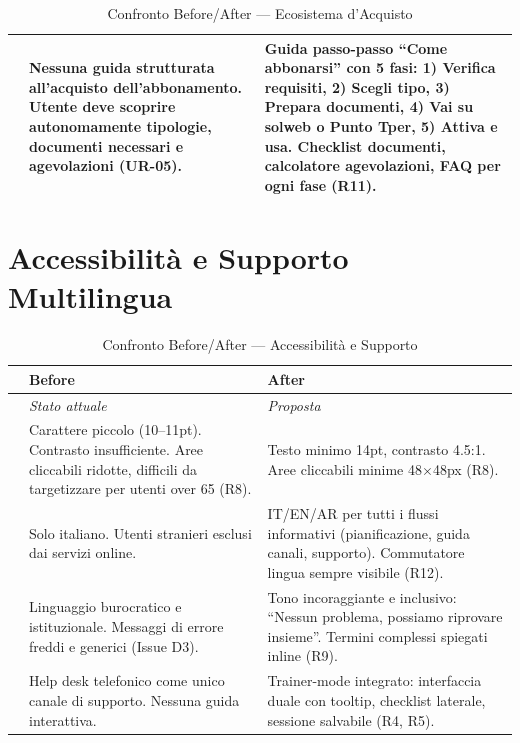 \documentclass[11pt,a4paper]{article}
\begin{document}
\begin{table}[H]
\begin{tabular}{|p{0.5cm}|p{7cm}|p{7cm}|}
\raisebox{0.5cm}{\rotatebox{90}{\textbf{Guida abbonamenti}}} &
Nessuna guida strutturata all'acquisto dell'abbonamento. Utente deve scoprire autonomamente tipologie, documenti necessari e agevolazioni (UR-05). &
Guida passo-passo ``Come abbonarsi'' con 5 fasi: 1) Verifica requisiti, 2) Scegli tipo, 3) Prepara documenti, 4) Vai su solweb o Punto Tper, 5) Attiva e usa. Checklist documenti, calcolatore agevolazioni, FAQ per ogni fase (R11). \\ \hline
\end{tabular}
\caption{Confronto Before/After --- Ecosistema d'Acquisto}
\label{tab:comp-ecosystem}
\end{table}

\vspace{0.3cm}

\section{Accessibilit\`a e Supporto Multilingua}

\begin{table}[H]
\centering
\small
\renewcommand{\arraystretch}{1.4}
\begin{tabular}{|p{0.5cm}|p{7cm}|p{7cm}|}
\hline
& \textbf{Before} & \textbf{After} \\ \hline
\cellcolor{primaryColor!15} &
\textit{Stato attuale} &
\textit{Proposta} \\ \hline

\raisebox{0.5cm}{\rotatebox{90}{\textbf{Testo}}} &
Carattere piccolo (10--11pt). Contrasto insufficiente. Aree cliccabili ridotte, difficili da targetizzare per utenti over 65 (R8). &
Testo minimo 14pt, contrasto 4.5:1. Aree cliccabili minime 48$\times$48px (R8). \\ \hline

\raisebox{0.5cm}{\rotatebox{90}{\textbf{Lingua}}} &
Solo italiano. Utenti stranieri esclusi dai servizi online. &
IT/EN/AR per tutti i flussi informativi (pianificazione, guida canali, supporto). Commutatore lingua sempre visibile (R12). \\ \hline

\raisebox{0.5cm}{\rotatebox{90}{\textbf{Tono}}} &
Linguaggio burocratico e istituzionale. Messaggi di errore freddi e generici (Issue D3). &
Tono incoraggiante e inclusivo: ``Nessun problema, possiamo riprovare insieme''. Termini complessi spiegati inline (R9). \\ \hline

\raisebox{0.5cm}{\rotatebox{90}{\textbf{Supporto}}} &
Help desk telefonico come unico canale di supporto. Nessuna guida interattiva. &
Trainer-mode integrato: interfaccia duale con tooltip, checklist laterale, sessione salvabile (R4, R5). \\ \hline
\end{tabular}
\caption{Confronto Before/After --- Accessibilit\`a e Supporto}
\label{tab:comp-accessibilita}
\end{table}
\end{document}
